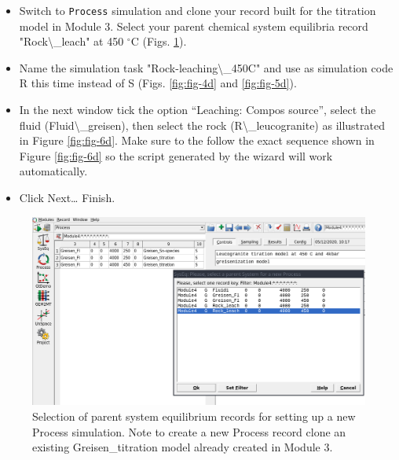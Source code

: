 \documentclass[
]{book}
\begin{document}
\begin{itemize}
\item
  Switch to \texttt{Process} simulation and clone your record built for the titration model in Module 3. Select your parent chemical system equilibria record "Rock\textbackslash\_leach" at 450 \(^\circ\)C (Figs. \ref{fig:fig-3d}).
\item
  Name the simulation task "Rock-leaching\textbackslash\_450C" and use as simulation code R this time instead of S (Figs. \ref{fig:fig-4d} and \ref{fig:fig-5d}).
\item
  In the next window tick the option ``Leaching: Compos source'', select the fluid (Fluid\textbackslash\_greisen), then select the rock (R\textbackslash\_leucogranite) as illustrated in Figure \ref{fig:fig-6d}. Make sure to the follow the exact sequence shown in Figure \ref{fig:fig-6d} so the script generated by the wizard will work automatically.
\item
  Click Next\ldots{} Finish.
\end{itemize}

\begin{figure}
\includegraphics[width=1\linewidth]{figures/module4/fig-3} \caption{Selection of parent system equilibrium records for setting up a new Process simulation. Note to create a new Process record clone an existing Greisen\_titration model already created in Module 3.}\label{fig:fig-3d}
\end{figure}
\end{document}
